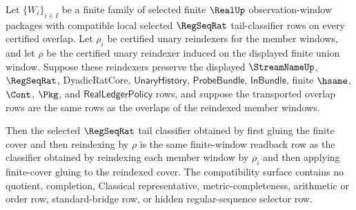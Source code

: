 \begin{theorem}
\label{thm:regseqrat-tail-classifier-reindexed-cover-compatibility}
Let $\{W_i\}_{i\in I}$ be a finite family of selected finite $\RealUp$
observation-window packages with compatible local selected $\RegSeqRat$
tail-classifier rows on every certified overlap. Let $\rho_i$ be certified
unary reindexers for the member windows, and let $\rho$ be the certified unary
reindexer induced on the displayed finite union window. Suppose these
reindexers preserve the displayed $\StreamNameUp$, $\RegSeqRat$,
DyadicRatCore, $\mathsf{UnaryHistory}$, $\mathsf{ProbeBundle}$,
$\mathsf{InBundle}$, finite $\hsame$, $\Cont$, $\Pkg$, and
$\mathsf{RealLedgerPolicy}$ rows, and suppose the transported overlap rows are
the same rows as the overlaps of the reindexed member windows.

Then the selected $\RegSeqRat$ tail classifier obtained by first gluing the
finite cover and then reindexing by $\rho$ is the same finite-window readback
row as the classifier obtained by reindexing each member window by $\rho_i$
and then applying finite-cover gluing to the reindexed cover. The compatibility
surface contains no quotient, completion, Classical representative,
metric-completeness, arithmetic or order row, standard-bridge row, or hidden
regular-sequence selector row.
\end{theorem}
